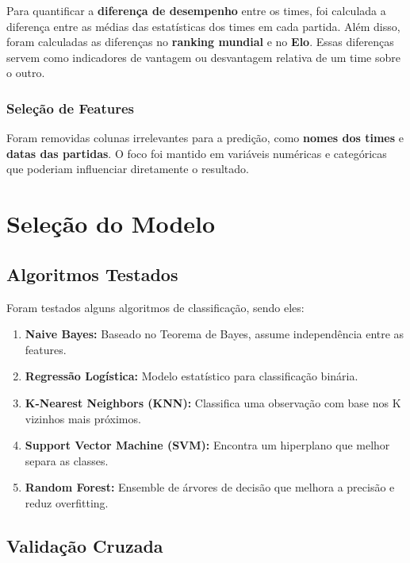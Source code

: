 \documentclass[a4paper,times,12pt]{article}
\begin{document}
\hspace{+15pt}
Para quantificar a \textbf{diferença de desempenho} entre os times, foi calculada a diferença entre as médias das estatísticas dos times em cada partida. Além disso, foram calculadas as diferenças no \textbf{ranking mundial} e no \textbf{Elo}. Essas diferenças servem como indicadores de vantagem ou desvantagem relativa de um time sobre o outro.

\subsubsection{Seleção de Features}

\hspace{+15pt}
Foram removidas colunas irrelevantes para a predição, como \textbf{nomes dos times} e \textbf{datas das partidas}. O foco foi mantido em variáveis numéricas e categóricas que poderiam influenciar diretamente o resultado.


\section{Seleção do Modelo}

\subsection{Algoritmos Testados}

\hspace{+15pt}
Foram testados alguns algoritmos de classificação, sendo eles:
\begin{enumerate}
  \item \textbf{Naive Bayes:} Baseado no Teorema de Bayes, assume independência entre as features.
  \item \textbf{Regressão Logística:} Modelo estatístico para classificação binária.
  \item \textbf{K-Nearest Neighbors (KNN):} Classifica uma observação com base nos K vizinhos mais próximos.
  \item \textbf{Support Vector Machine (SVM):} Encontra um hiperplano que melhor separa as classes.
  \item \textbf{Random Forest:} Ensemble de árvores de decisão que melhora a precisão e reduz overfitting.
\end{enumerate}

\subsection{Validação Cruzada}
\end{document}
